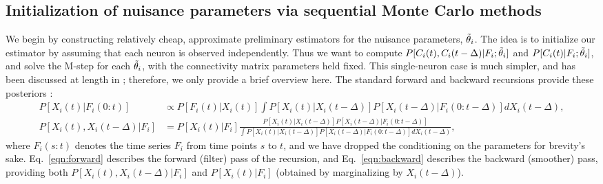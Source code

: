 \subsection{Initialization of nuisance parameters via sequential
  Monte Carlo methods} \label{sec:methods:indep}

We begin by constructing relatively cheap, approximate preliminary estimators for the nuisance parameters, $\tilde{\mathbf{\theta}}_i$.
The idea is to initialize our estimator by assuming that each neuron is observed independently. Thus we want to compute $P[C_i(t), C_i(t-\Delta) | F_i; \tilde{\mathbf{\theta}}_i]$ and $P[C_i(t)|F_i;\tilde{\mathbf{\theta}}_i]$, and solve the M-step for each $\tilde{\mathbf{\theta}}_i$, with the connectivity matrix parameters held fixed. This single-neuron case is much simpler, and has been discussed at length in \cite{Vogelstein2009}; therefore, we only provide a brief overview here. The standard forward and backward recursions provide these posteriors \cite{ShumwayStoffer06}:
\begin{align}
P[X_i(t) | F_i(0:t)] &\propto P[F_i(t)| X_i(t)] \int P[X_i(t) |
    X_i(t-\Delta)] P[X_i(t-\Delta) | F_i(0:t-\Delta)] dX_i(t-\Delta),
\label{eqn:forward} \\
P[X_i(t), X_i(t-\Delta) | F_i] &= P[X_i(t) | F_i]
\frac{P[X_i(t) | X_i(t-\Delta)] P[X_i(t-\Delta) |
F_i(0:t-\Delta)]}{\int P[X_i(t) | X_i(t-\Delta)] P[X_i(t-\Delta) |
F_i(0:t-\Delta)] dX_i(t-\Delta)},
\label{eqn:backward}
\end{align}
where $F_i(s:t)$ denotes the time series $F_i$ from time points $s$ to $t$, and we have dropped the conditioning on the parameters for brevity's sake. Eq.~\eqref{eqn:forward} describes the forward (filter) pass of the recursion, and Eq.~\eqref{eqn:backward} describes the backward (smoother) pass, providing both $P[X_i(t), X_i(t-\Delta) | F_i]$ and $P[X_i(t)|F_i]$ (obtained by marginalizing by $X_i(t-\Delta)$).

